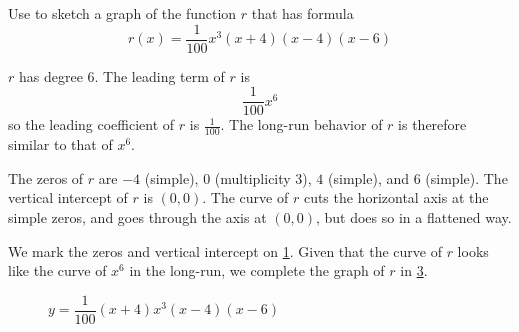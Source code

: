 	 \begin{pccexample}
		 Use  to sketch a graph of the function $r$
		 that has formula
		 \[
			 r(x)=\frac{1}{100}x^3(x+4)(x-4)(x-6)
		 \]
		 \begin{pccsolution}
			 \begin{steps}
				 \item $r$ has degree $6$. The leading term of $r$ is
				 \[
					 \frac{1}{100}x^6
				 \]
				 so the leading coefficient of $r$ is $\frac{1}{100}$. The long-run behavior of $r$
				 is therefore similar to that of $x^6$.
				 \item The zeros of $r$ are $-4$ (simple), $0$ (multiplicity $3$), $4$ (simple),
				 and $6$ (simple). The vertical intercept of $r$ is $(0,0)$. The curve of $r$
				 cuts the horizontal axis at the simple zeros, and goes through the axis
				 at $(0,0)$, but does so in a flattened way.
				 \item We mark the zeros and vertical intercept on \cref{poly:fig:degree6p1}. Given that
				 the curve of $r$ looks like the curve of $x^6$ in the long-run, we complete the graph
				 of $r$ in \cref{poly:fig:degree6p2}.
			 \end{steps}

			 \begin{figure}[!htbp]
				 \begin{subfigure}{.45\textwidth}
					 \caption{}
					 \label{poly:fig:degree6p1}
				 \end{subfigure}%
				 \hfill
				 \begin{subfigure}{.45\textwidth}
					 \caption{}
					 \label{poly:fig:degree6p2}
				 \end{subfigure}%
				 \caption{$y=\dfrac{1}{100}(x+4)x^3(x-4)(x-6)$}
			 \end{figure}
		 \end{pccsolution}
	 \end{pccexample}

